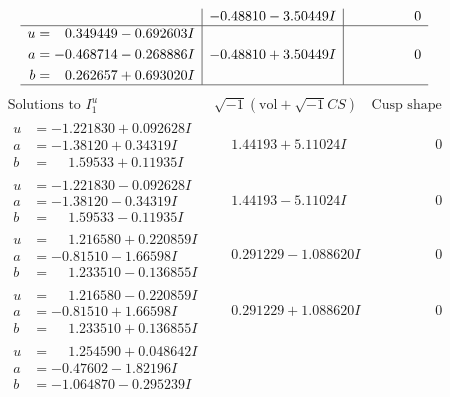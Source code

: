 \documentclass[1p]{elsarticle_modified}
\theoremstyle{definition}
\newcommand{\I}{\sqrt{-1}}
\begin{document}
$$\begin{array}{c|c|c}
 & -0.48810 - 3.50449 I & \phantom{-0.000000 } 0 \\ \hline\begin{aligned}
u &= \phantom{-}0.349449 - 0.692603 I \\
a &= -0.468714 - 0.268886 I \\
b &= \phantom{-}0.262657 + 0.693020 I\end{aligned}
 & -0.48810 + 3.50449 I & \phantom{-0.000000 } 0\\
 \hline 
 \end{array}$$\newpage$$\begin{array}{c|c|c}  
\text{Solutions to }I^u_{1}& \I (\text{vol} + \sqrt{-1}CS) & \text{Cusp shape}\\
 \hline 
\begin{aligned}
u &= -1.221830 + 0.092628 I \\
a &= -1.38120 + 0.34319 I \\
b &= \phantom{-}1.59533 + 0.11935 I\end{aligned}
 & \phantom{-}1.44193 + 5.11024 I & \phantom{-0.000000 } 0 \\ \hline\begin{aligned}
u &= -1.221830 - 0.092628 I \\
a &= -1.38120 - 0.34319 I \\
b &= \phantom{-}1.59533 - 0.11935 I\end{aligned}
 & \phantom{-}1.44193 - 5.11024 I & \phantom{-0.000000 } 0 \\ \hline\begin{aligned}
u &= \phantom{-}1.216580 + 0.220859 I \\
a &= -0.81510 - 1.66598 I \\
b &= \phantom{-}1.233510 - 0.136855 I\end{aligned}
 & \phantom{-}0.291229 - 1.088620 I & \phantom{-0.000000 } 0 \\ \hline\begin{aligned}
u &= \phantom{-}1.216580 - 0.220859 I \\
a &= -0.81510 + 1.66598 I \\
b &= \phantom{-}1.233510 + 0.136855 I\end{aligned}
 & \phantom{-}0.291229 + 1.088620 I & \phantom{-0.000000 } 0 \\ \hline\begin{aligned}
u &= \phantom{-}1.254590 + 0.048642 I \\
a &= -0.47602 - 1.82196 I \\
b &= -1.064870 - 0.295239 I\end{aligned}

\end{array}$$
\end{document}
